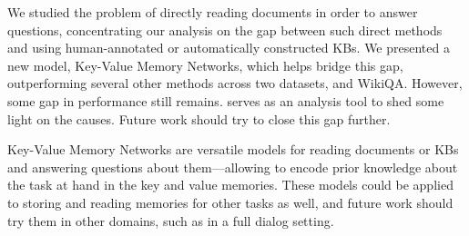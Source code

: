 



We studied the problem of directly reading documents in order to answer questions,
concentrating our analysis on the gap between such direct methods and using
human-annotated or automatically constructed KBs.
We presented a new model, Key-Value Memory Networks, which helps bridge this gap,
outperforming several other methods across two datasets, \WikiMovies and {\sc WikiQA}.
However, some gap in performance still remains. \WikiMovies serves as an
 analysis tool to shed some light on the causes.
Future work should try to close this gap further.

Key-Value Memory Networks are versatile models for reading documents or KBs and answering
questions about them---allowing to encode prior knowledge about the task at hand
in the key and value memories. These models could be applied to storing and
reading memories
for other tasks as well, and future work should try them in other domains,
such as in a full dialog setting.
